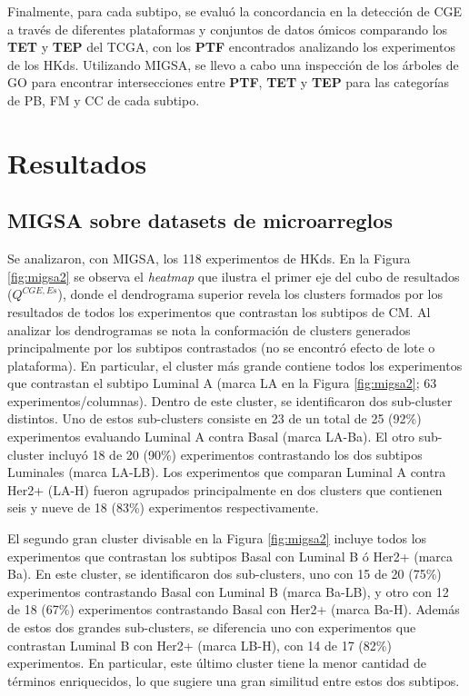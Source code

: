 \documentclass[12pt,twoside]{reedthesis}
\begin{document}
Finalmente, para cada subtipo, se evaluó la concordancia en la detección de CGE a través de diferentes plataformas y conjuntos de datos ómicos comparando los \textbf{TET} y \textbf{TEP} del TCGA, con los \textbf{PTF} encontrados analizando los experimentos de los HKds. Utilizando MIGSA, se llevo a cabo una inspección de los árboles de GO para encontrar intersecciones entre \textbf{PTF}, \textbf{TET} y \textbf{TEP} para las categorías de PB, FM y CC de cada subtipo.

\hypertarget{resultados-1}{%
\section{Resultados}\label{resultados-1}}

\hypertarget{migsa-sobre-datasets-de-microarreglos}{%
\subsection{MIGSA sobre datasets de microarreglos}\label{migsa-sobre-datasets-de-microarreglos}}

\par

Se analizaron, con MIGSA, los 118 experimentos de HKds. En la Figura \ref{fig:migsa2} se observa el \emph{heatmap} que ilustra el primer eje del cubo de resultados (\(Q^{CGE,Es}\)), donde el dendrograma superior revela los clusters formados por los resultados de todos los experimentos que contrastan los subtipos de CM. Al analizar los dendrogramas se nota la conformación de clusters generados principalmente por los subtipos contrastados (no se encontró efecto de lote o plataforma). En particular, el cluster más grande contiene todos los experimentos que contrastan el subtipo Luminal A (marca LA en la Figura \ref{fig:migsa2}; 63 experimentos/columnas). Dentro de este cluster, se identificaron dos sub-cluster distintos. Uno de estos sub-clusters consiste en 23 de un total de 25 (92\%) experimentos evaluando Luminal A contra Basal (marca LA-Ba). El otro sub-cluster incluyó 18 de 20 (90\%) experimentos contrastando los dos subtipos Luminales (marca LA-LB). Los experimentos que comparan Luminal A contra Her2+ (LA-H) fueron agrupados principalmente en dos clusters que contienen seis y nueve de 18 (83\%) experimentos respectivamente.

\par

El segundo gran cluster divisable en la Figura \ref{fig:migsa2} incluye todos los experimentos que contrastan los subtipos Basal con Luminal B ó Her2+ (marca Ba). En este cluster, se identificaron dos sub-clusters, uno con 15 de 20 (75\%) experimentos contrastando Basal con Luminal B (marca Ba-LB), y otro con 12 de 18 (67\%) experimentos contrastando Basal con Her2+ (marca Ba-H). Además de estos dos grandes sub-clusters, se diferencia uno con experimentos que contrastan Luminal B con Her2+ (marca LB-H), con 14 de 17 (82\%) experimentos. En particular, este último cluster tiene la menor cantidad de términos enriquecidos, lo que sugiere una gran similitud entre estos dos subtipos.
\end{document}
